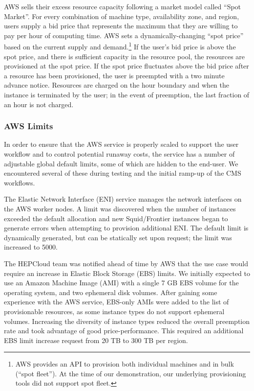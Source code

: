 \documentclass[twocolumn]{svjour3}          %
\begin{document}
AWS sells their excess resource capacity following a market model called ``Spot Market''. For every combination of machine type, availability zone, and region, users supply a bid price that represents the maximum that they are willing to pay per hour of computing time. AWS sets a dynamically-changing ``spot price'' based on the current supply and demand.\footnote{AWS provides an API to provision both individual machines and in bulk (``spot fleet''). At the time of our demonstration, our underlying provisioning tools did not support spot fleet.} If the user's bid price is above the spot price, and there is sufficient capacity in the resource pool, the resources are provisioned at the spot price. If the spot price fluctuates above the bid price after a resource has been provisioned, the user is preempted with a two minute advance notice. Resources are charged on the hour boundary and when the instance is terminated by the user; in the event of preemption, the last fraction of an hour is not charged.

\subsubsection{AWS Limits}
In order to ensure that the AWS service is properly scaled to support the user workflow and to control potential runaway costs, the service has a number of adjustable global default limits, some of which are hidden to the end-user. We encountered several of these during testing and the initial ramp-up of the CMS workflows.

The Elastic Network Interface (ENI) service manages the network interfaces on the AWS worker nodes. A limit was discovered when the number of instances exceeded the default allocation and new Squid/Frontier instances began to generate errors when attempting to provision additional ENI. The default limit is dynamically generated, but can be statically set upon request; the limit was increased to 5000.

The HEPCloud team was notified ahead of time by AWS that the use case would require an increase in Elastic Block Storage (EBS) limits. We initially expected to use an Amazon Machine Image (AMI) with a single 7 GB EBS volume for the operating system, and two ephemeral disk volumes. After gaining some experience with the AWS service, EBS-only AMIs were added to the list of provisionable resources, as some instance types
do not support ephemeral volumes. Increasing the diversity of instance types reduced the overall preemption rate and took advantage of good price-performance. This required an additional EBS limit increase request from 20 TB to 300 TB per region.
\end{document}
